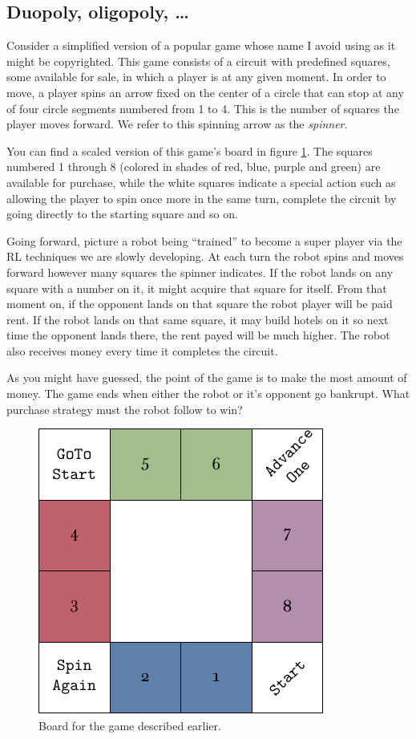 \subsection{Duopoly, oligopoly, \ldots}
Consider a simplified version of a popular game whose name I 
avoid using as it might be copyrighted. This game consists of a 
circuit with predefined squares, some available for sale, in 
which a player is at any given moment. In order to move, a 
player spins an arrow fixed on the center of a circle that can 
stop at any of four circle segments numbered from 1 to 4. This 
is the number of squares the player moves forward. We refer to 
this spinning arrow as the \textit{spinner}.

You can find a scaled version of this game's board in figure 
\ref{fig:miniopoly-board}. The squares numbered 1 through 8 
(colored in shades of red, blue, purple and green) are 
available for purchase, while the white squares indicate a 
special action such as allowing the player to spin once more in 
the same turn, complete the circuit by going directly to the 
starting square and so on.

Going forward, picture a robot being ``trained'' to become a 
super player via the RL techniques we are slowly developing. At 
each turn the robot spins and moves forward however many 
squares the spinner indicates. If the robot lands on any square 
with a number on it, it might acquire that square for itself. 
From that moment on, if the opponent lands on that square the 
robot player will be paid rent. If the robot lands on that same 
square, it may build hotels on it so next time the opponent 
lands there, the rent payed will be much higher. The robot also 
receives money every time it completes the circuit.

As you might have guessed, the point of the game is to make the 
most amount of money. The game ends when either the robot or 
it's opponent go bankrupt. What purchase strategy must the 
robot follow to win?
\begin{figure}[H]
	\centering
	\includegraphics[width=.65\textwidth]{img/board.pdf}
	\caption{Board for the game described earlier.}
	\label{fig:miniopoly-board}
\end{figure}

